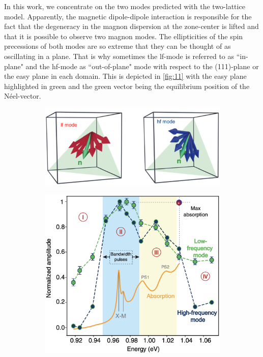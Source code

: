 In this work, we concentrate on the two modes predicted with the two-lattice model.
Apparently, the magnetic dipole-dipole interaction is responsible for the fact that the degeneracy in the magnon dispersion at the zone-center is lifted and that it is possible to observe two magnon modes. \cite{gumarilang_role_2023}
The ellipticities of the spin precessions of both modes are so extreme that they can be thought of as oscillating in a plane.
That is why sometimes the lf-mode is referred to as ``in-plane" and the hf-mode as ``out-of-plane" mode with respect to the (111)-plane or the easy plane in each domain. This is depicted in \autoref{fig:11} with the easy plane highlighted in green and the green vector being the equilibrium position of the Néel-vector.
\begin{figure}[htb!]
    \centering
    \begin{subfigure}[c]{0.45\textwidth}
        \includegraphics[width=\textwidth]{pictures/11.png}
        \caption{}
        \label{fig:11}
    \end{subfigure}
    \hspace{0.4cm}
    \begin{subfigure}[c]{0.5\textwidth}
        \includegraphics[width=\textwidth]{pictures/7.png}

\end{subfigure}
\end{figure}
